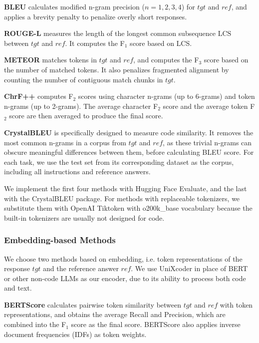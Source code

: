 \textbf{BLEU} \cite{DBLP:conf/acl/PapineniRWZ02} calculates modified n-gram precision (\(n=1,2,3,4\)) for \(tgt\) and \(ref\), and applies a brevity penalty to penalize overly short responses.

\textbf{ROUGE-L} \cite{lin2004rouge} measures the length of the longest common subsequence \(\text{LCS}\) between \(tgt\) and \(ref\). It computes the F\(_1\) score based on LCS.

\textbf{METEOR} \cite{DBLP:conf/acl/BanerjeeL05} matches tokens in \(tgt\) and \(ref\), and computes the F\(_3\) score based on the number of matched tokens. It also penalizes fragmented alignment by counting the number of contiguous match chunks in \(tgt\).

\textbf{ChrF++} \cite{DBLP:conf/wmt/Popovic17} computes F\(_2\) scores using character n-grams (up to 6-grams) and token n-grams (up to 2-grams). The average character F\(_2\) score and the average token F\(_2\) score are then averaged to produce the final score.

\textbf{CrystalBLEU} \cite{DBLP:conf/kbse/EghbaliP22} is specifically designed to measure code similarity. It removes the most common n-grams in a corpus from \(tgt\) and \(ref\), as these trivial n-grams can obscure meaningful differences between them, before calculating BLEU score. For each task, we use the test set from its corresponding dataset as the corpus, including all instructions and reference answers.

We implement the first four methods with Hugging Face Evaluate, and the last with the CrystalBLEU package. For methods with replaceable tokenizers, we substitute them with OpenAI Tiktoken with o200k\_base vocabulary because the built-in tokenizers are usually not designed for code. 

\subsubsection{Embedding-based Methods}
We choose two methods based on embedding, i.e. token representations of the response \(tgt\) and the reference answer \(ref\). We use UniXcoder \cite{DBLP:conf/acl/GuoLDW0022} in place of BERT or other non-code LLMs as our encoder, due to its ability to process both code and text.

\textbf{BERTScore} \cite{DBLP:conf/iclr/ZhangKWWA20} calculates pairwise token similarity between \(tgt\) and \(ref\) with token representations, and obtains the average Recall and Precision, which are combined into the F\(_1\) score as the final score. BERTScore also applies inverse document frequencies (IDFs) as token weights.


